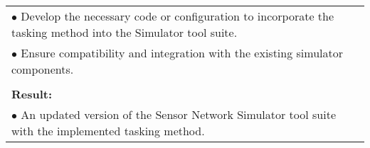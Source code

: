 \begin{table}[!h]
\begin{center}
\begin{tabular}{|p{35mm}||p{55mm}|p{50mm}||p{40mm}|}
      \multicolumn{4}{|p{150mm}|}{$\bullet$ Develop the necessary code or configuration to incorporate the tasking method into the Simulator tool suite.}\\
      \multicolumn{4}{|p{150mm}|}{$\bullet$ Ensure compatibility and integration with the existing simulator components.} \\
      \multicolumn{4}{|p{150mm}|}{}                                                                                                                                                                           \\
      \multicolumn{4}{|p{150mm}|}{\textbf{Result:}}                                                                                                                                                       \\
      \multicolumn{4}{|p{150mm}|}{$\bullet$ An updated version of the Sensor Network Simulator tool suite with the implemented tasking method.}                                                                                                                          \\
      \hline
    \end{tabular}
  \end{center}
\end{table}

\clearpage

